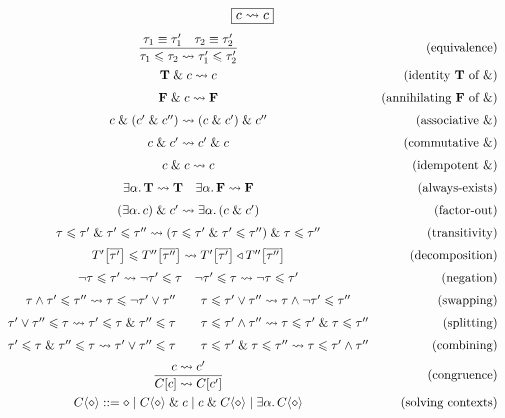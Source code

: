 $$ \boxed{c \leadsto c} $$
$$ \renewcommand\arraystretch{1.5} \begin{array}{cr}
\dfrac{\tau_1 \equiv \tau_1' \quad \tau_2 \equiv \tau_2'}{\tau_1 \sub \tau_2 \step \tau_1' \sub \tau_2'} 
& \text{(equivalence)}
\\[4pt]
\tru \und c \step c 
& \text{(identity $\tru$ of $\undsym$)}
\\
\fals \und c \step \fals
& \text{(annihilating $\fals$ of $\undsym$)}
\\
c \und (c' \und c'') \step (c \und c') \und c'' 
& \text{(associative $\undsym$)}
\\
c \und c' \step c' \und c
& \text{(commutative $\undsym$)}
\\
c \und c \step c
& \text{(idempotent $\undsym$)}
\\
\exists \alpha \ldotp \tru \step \tru 
\quad
\exists \alpha \ldotp \fals \step \fals
& \text{(always-exists)}
\\
(\exists \alpha \ldotp c) \und c' \step \exists \alpha \ldotp (c \und c')
& \text{(factor-out)}
\\ 
\tau \sub \tau' \und \tau' \sub \tau'' \step (\tau \sub \tau' \und \tau' \sub \tau'') \und \tau \sub \tau'' 
& \text{(transitivity)}
\\
T'\left[\overline {\tau'}\right] \sub T''\left[\overline {\tau''}\right] 
\step T'\left[\overline {\tau'}\right] \triangleleft T''\left[\overline {\tau''}\right]
& \text{(decomposition)}
\\
\comp \tau \sub \tau' \step \comp \tau' \sub \tau  \quad \comp \tau' \sub \tau \step \comp \tau \sub \tau'
& \text{(negation)}
\\
\tau \meet \tau' \sub \tau'' \step \tau \sub \comp \tau' \join \tau''
\qquad
\tau \sub \tau' \join \tau'' \step \tau \meet \comp \tau' \sub \tau''
& \text{(swapping)}
\\
\tau' \join \tau'' \sub \tau \step \tau' \sub \tau \und \tau'' \sub \tau
\qquad
\tau \sub \tau' \meet \tau'' \step \tau \sub \tau' \und \tau \sub \tau''
& \text{(splitting)} 
\\
\tau' \sub \tau \und \tau'' \sub \tau \step \tau' \join \tau'' \sub \tau
\qquad
\tau \sub \tau' \und \tau \sub \tau'' \step \tau \sub \tau' \meet \tau''
& \text{(combining)} 
\\[4pt]
\dfrac{c \step c'}{C[c] \step C[c']}
& \text{(congruence)} 
\\[4pt]
\solvectx ::= \ctxhole \mid \solvectx \und c \mid c \und \solvectx \mid \exists \alpha \ldotp \solvectx 
& \text{(solving contexts)}
\end{array} $$
